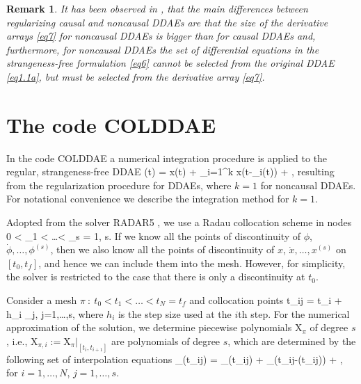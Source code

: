 \documentclass[final,reqno]{siamltex}
\newtheorem{remark}[theorem]{Remark}
\begin{document}
\begin{remark}{\rm
It  has been observed in \cite{HaM14}, that the main differences between regularizing causal and noncausal DDAEs are
that the size of the derivative arrays \eqref{eq7} for noncausal DDAEs is bigger than for causal DDAEs and, furthermore, for noncausal DDAEs the set of differential equations in the strangeness-free formulation \eqref{eq6} cannot be selected from the original DDAE \eqref{eq1.1a}, but must be  selected from the derivative array \eqref{eq7}.
}
\end{remark}

\section{The code  COLDDAE}
In the code COLDDAE a numerical integration procedure is applied to the regular, strangeness-free DDAE
%
\be\label{eq3.1}
  (t) =  x(t) + \sum_{i=1}^k x(t-\tau_i(t)) + ,
\ee
%
resulting from the regularization procedure for DDAEs,
where $k=1$ for noncausal DDAEs. For notational convenience  we describe the integration method for $k=1$.

Adopted from the solver RADAR5 \cite{GugH07}, we use a Radau collocation scheme in nodes
%
\be\label{eq3.2}
  0 < \de_1 < \dots < \de_s = 1, \quad s\in {}.
\ee
%
If we know all the  points of discontinuity of $\phi$, $\dot{\phi},\dots,\phi^{(s)}$, then we also know all the points of discontinuity 
of $x$, $\dot{x},\dots,x^{(s)}$ on $[t_0,t_f]$, and hence we can include them into the mesh.
However, for simplicity, the solver is restricted to the case that there is only a discontinuity at $t_0$.

Consider a mesh $\pi \ : \ t_0 < t_1 < \dots < t_N = t_f$ and collocation points
%
\be\label{eq3.3}
  t_{ij} = t_i + h_i \de_j, \qquad j=1,\dots,s,
\ee
%
where $h_i$ is the step size used at the $i$th step.
For the numerical approximation of the solution, we determine  piecewise polynomials $\mathrm{X}_{\pi}$ of degree $s$, i.e.,
$\mathrm{X}_{\pi,i}:=\mathrm{X}_{\pi}|_{[t_i,t_{i+1}]}$ are polynomials of degree $s$, which are determined by the following set of
interpolation equations
%
\be\label{eq3.4}
  _{\pi}(t_{ij}) =  _{\pi}(t_{ij}) +
  _{\pi}(t_{ij}-\tau(t_{ij}))
 + ,
\ee
%
for  $i=1,\dots,N$, $j=1,\dots,s$.
\end{document}
